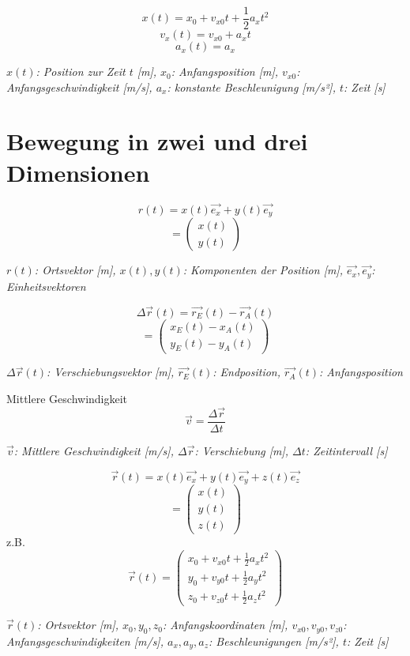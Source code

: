 \documentclass[a4paper,10pt]{article}
\newenvironment{displayformula}
{
	\begin{framed}
		\color{formulaColor}
	}
	{\end{framed}}
\newcommand{\formulalegend}[1]{%
	\par\vspace{0.5ex}%
	{{\color{legendColor}\RaggedRight\small\textit{#1}}}%
	\par\vspace{1.5ex}%
}
\begin{document}
\begin{displayformula}
	\[
	x(t) = x_0 + v_{x0}t + \frac{1}{2} a_x t^2 
	\]
	\[
	v_x(t) = v_{x0} + a_x t
	\]
	\[
	a_x(t) = a_x
	\]
\end{displayformula}
\formulalegend{
	\( x(t) \): Position zur Zeit \( t \) [m], \( x_0 \): Anfangsposition [m], \( v_{x0} \): Anfangsgeschwindigkeit [m/s], \( a_x \): konstante Beschleunigung [m/s²], \( t \): Zeit [s]
}

\section{Bewegung in zwei und drei Dimensionen}

\begin{displayformula}
	\[
	r(t) = x(t)\vec{e_x} + y(t)\vec{e_y}
	\]
	\[
	= \begin{pmatrix}
		x(t) \\
		y(t)
	\end{pmatrix}
	\]
\end{displayformula}
\formulalegend{
	\( r(t) \): Ortsvektor [m], \( x(t), y(t) \): Komponenten der Position [m], \( \vec{e_x}, \vec{e_y} \): Einheitsvektoren
}

\begin{displayformula}
	\[
	\Delta \vec{r}(t) = \vec{r_E}(t) - \vec{r_A}(t)
	\]
	\[
	= \begin{pmatrix}
		x_E(t) - x_A(t) \\
		y_E(t) - y_A(t)
	\end{pmatrix}
	\]
\end{displayformula}
\formulalegend{
	\( \Delta \vec{r}(t) \): Verschiebungsvektor [m], \( \vec{r_E}(t) \): Endposition, \( \vec{r_A}(t) \): Anfangsposition
}

\begin{displayformula}
	Mittlere Geschwindigkeit
	\[
	\vec{v} = \frac{\Delta \vec{r}}{\Delta t}
	\]
\end{displayformula}
\formulalegend{
	\( \vec{v} \): Mittlere Geschwindigkeit [m/s], \( \Delta \vec{r} \): Verschiebung [m], \( \Delta t \): Zeitintervall [s]
}

\begin{displayformula}
	\[
	\vec{r}(t) = x(t)\vec{e_x} + y(t)\vec{e_y} + z(t)\vec{e_z}
	\]
	\[
	=
	\begin{pmatrix}
		x(t)\\
		y(t) \\
		z(t)
	\end{pmatrix}
	\]
	z.B.
	\[
	\vec{r}(t) = \begin{pmatrix}
		x_0 + v_{x0}t + \frac{1}{2}a_x t^2 \\
		y_0 + v_{y0}t + \frac{1}{2}a_y t^2 \\
		z_0 + v_{z0}t + \frac{1}{2}a_z t^2 
	\end{pmatrix}
	\]
\end{displayformula}
\formulalegend{
	\( \vec{r}(t) \): Ortsvektor [m], \( x_0, y_0, z_0 \): Anfangskoordinaten [m], \( v_{x0}, v_{y0}, v_{z0} \): Anfangsgeschwindigkeiten [m/s], \( a_x, a_y, a_z \): Beschleunigungen [m/s²], \( t \): Zeit [s]
}
\end{document}
